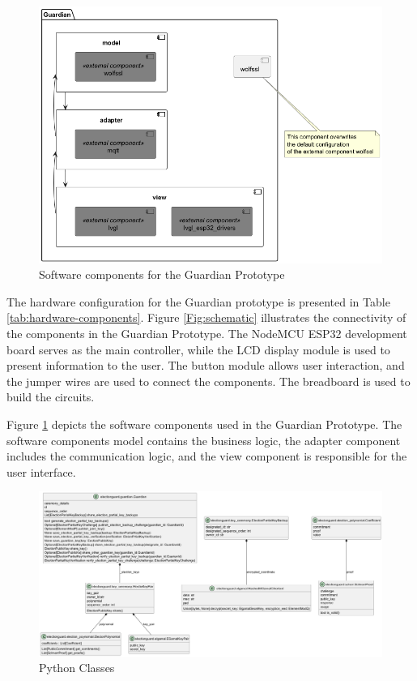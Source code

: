 \begin{figure}
	\centering
	\includegraphics[scale=.7]{abbildungen/Diagramme/components.png}
	\caption{Software components for the Guardian Prototype}\label{Fig:software-components} 
\end{figure}

The hardware configuration for the Guardian prototype is presented in Table \ref{tab:hardware-components}. Figure \ref{Fig:schematic} illustrates the connectivity of the components in the Guardian Prototype. The NodeMCU ESP32 development board serves as the main controller, while the LCD display module is used to present information to the user. The button module allows user interaction, and the jumper wires are used to connect the components. The breadboard is used to build the circuits. 

Figure \ref{Fig:software-components} depicts the software components used in the Guardian Prototype. The software components model contains the business logic, the adapter component includes the communication logic, and the view component is responsible for the user interface.

\begin{figure}
	\centering
	\includegraphics[scale=.7]{abbildungen/Diagramme/python-classes.png}
	\caption{Python Classes}\label{Fig:python-class} 
\end{figure}

